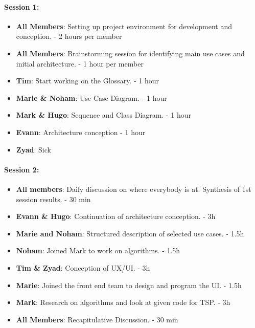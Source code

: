 \documentclass{article}
\begin{document}
\paragraph{Session 1:}
\begin{itemize}
    \item \textbf{All Members}: Setting up project environment for development and conception. - 2 hours per member
    \item \textbf{All Members}: Brainstorming session for identifying main use cases and initial architecture. - 1 hour per member
    \item \textbf{Tim}: Start working on the Glossary. - 1 hour
    \item \textbf{Marie \& Noham}: Use Case Diagram. - 1 hour
    \item \textbf{Mark \& Hugo}: Sequence and Class Diagram. - 1 hour
    \item \textbf{Evann}: Architecture conception - 1 hour
    \item \textbf{Zyad}: Sick
\end{itemize}

\paragraph{Session 2:}
\begin{itemize}
    \item \textbf{All members}: Daily discussion on where everybody is at. Synthesis of 1st session results. - 30 min
    \item \textbf{Evann \& Hugo}: Continuation of architecture conception. - 3h
    \item \textbf{Marie and Noham}: Structured description of selected use cases. - 1.5h
    \item \textbf{Noham}: Joined Mark to work on algorithms. - 1.5h
    \item \textbf{Tim \& Zyad}: Conception of UX/UI. - 3h
    \item \textbf{Marie}: Joined the front end team to design and program the UI. - 1.5h
    \item \textbf{Mark}: Research on algorithms and look at given code for TSP. - 3h
    \item \textbf{All Members}: Recapitulative Discussion. - 30 min
\end{itemize}
\end{document}
